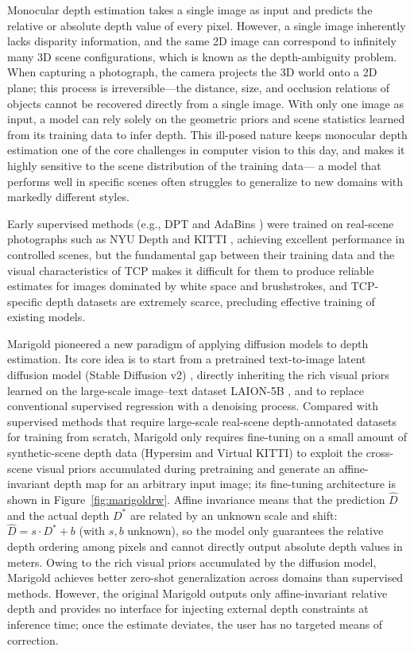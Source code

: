 Monocular depth estimation takes a single image as input
and predicts the relative or absolute depth value of every pixel.
However, a single image inherently lacks disparity information,
and the same 2D image can correspond to infinitely many 3D scene configurations,
which is known as the depth-ambiguity problem.
When capturing a photograph, the camera projects the 3D world onto a 2D plane;
this process is irreversible---the distance, size, and occlusion relations of objects cannot be recovered directly from a single image.
With only one image as input,
a model can rely solely on the geometric priors
and scene statistics learned from its training data to infer depth.
This ill-posed nature keeps monocular depth estimation one of the core challenges in computer vision to this day,
and makes it highly sensitive to the scene distribution of the training data---
a model that performs well in specific scenes often struggles to generalize to new domains with markedly different styles.

Early supervised methods (e.g., DPT \cite{dpt} and AdaBins \cite{adabins}) were trained on real-scene photographs such as NYU Depth \cite{nyudepth} and KITTI \cite{kitti},
achieving excellent performance in controlled scenes,
but the fundamental gap between their training data and the visual characteristics of TCP
makes it difficult for them to produce reliable estimates for images dominated by white space and brushstrokes,
and TCP-specific depth datasets are extremely scarce, precluding effective training of existing models.

Marigold \cite{marigold} pioneered a new paradigm of applying diffusion models to depth estimation.
Its core idea is to start from a pretrained text-to-image latent diffusion model (Stable Diffusion v2) \cite{ldm},
directly inheriting the rich visual priors learned on the large-scale image--text dataset LAION-5B \cite{LAION-5B},
and to replace conventional supervised regression with a denoising process.
Compared with supervised methods that require large-scale real-scene depth-annotated datasets for training from scratch,
Marigold only requires fine-tuning on a small amount of synthetic-scene depth data (Hypersim and Virtual KITTI)
to exploit the cross-scene visual priors accumulated during pretraining
and generate an affine-invariant depth map for an arbitrary input image;
its fine-tuning architecture is shown in Figure~\ref{fig:marigoldrw}.
Affine invariance means that the prediction $\hat{D}$ and the actual depth $D^*$
are related by an unknown scale and shift:
$\hat{D} = s \cdot D^* + b$ (with $s, b$ unknown),
so the model only guarantees the relative depth ordering among pixels and cannot directly output absolute depth values in meters.
Owing to the rich visual priors accumulated by the diffusion model, Marigold achieves better zero-shot generalization across domains than supervised methods.
However, the original Marigold outputs only affine-invariant relative depth
and provides no interface for injecting external depth constraints at inference time;
once the estimate deviates, the user has no targeted means of correction.

